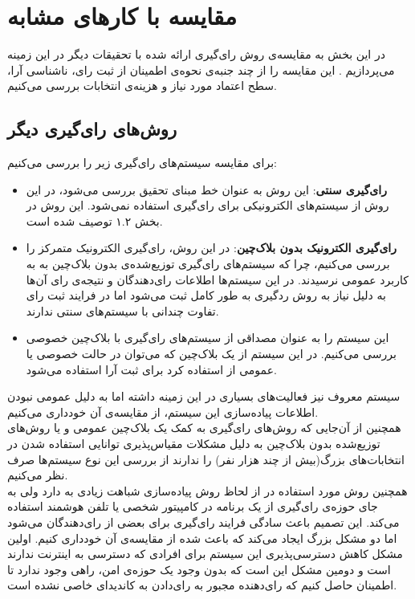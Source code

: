 \section{مقایسه با کارهای مشابه}
در این بخش به مقایسه‌‌ی روش رای‌گیری ارائه شده با تحقیقات دیگر در این زمینه می‌پردازیم . این مقایسه را از چند جنبه‌ی نحوه‌ی اطمینان از ثبت رای، ناشناسی آرا،  سطح اعتماد مورد نیاز و  هزینه‌ی انتخابات بررسی می‌کنیم. 
\subsection{روش‌های رای‌گیری دیگر}
برای مقایسه سیستم‌های رای‌گیری زیر را بررسی می‌کنیم:
\begin{itemize}
	\item 
	\textbf{رای‌گیری سنتی}:
	این روش به عنوان خط مبنای تحقیق بررسی می‌شود، در این روش از سیستم‌های الکترونیکی برای رای‌گیری استفاده نمی‌شود. این روش در بخش ۱.۲ توصیف شده است. 
	\item \textbf{رای‌‌گیری الکترونیک بدون بلاک‌چین}:
	در این روش، رای‌گیری الکترونیک متمرکز را بررسی می‌کنیم، چرا که سیستم‌های رای‌گیری توزیع‌شده‌ی بدون بلاک‌چین به به کاربرد عمومی نرسیدند. در این سیستم‌ها اطلاعات رای‌دهندگان و نتیجه‌ی رای آن‌ها به دلیل نیاز به روش ردگیری به طور کامل ثبت می‌شود اما در فرایند ثبت رای تفاوت چندانی با سیستم‌های سنتی ندارند.
 	\item \textbf{}
 	این سیستم را به عنوان مصداقی از سیستم‌های رای‌گیری با بلاک‌چین خصوصی بررسی می‌کنیم. 
 	در این سیستم از یک‌ بلاک‌چین که می‌توان در حالت خصوصی یا عمومی از استفاده کرد برای ثبت آرا استفاده می‌شود. 
\end{itemize}
\par
 	 سیستم‌ معروف  نیز فعالیت‌های بسیاری در این زمینه داشته اما به دلیل عمومی نبودن اطلاعات پیاده‌سازی این سیستم‌، از مقایسه‌ی آن خود‌داری می‌کنیم. 
 	 \\
 	 همچنین از آن‌جایی که روش‌های رای‌گیری به کمک یک بلاک‌چین عمومی و یا روش‌های توزیع‌شده بدون بلاک‌چین به دلیل مشکلات مقیاس‌پذیری توانایی استفاده شدن در انتخابات‌های بزرگ(بیش از چند هزار نفر) را ندارند از بررسی این نوع سیستم‌ها صرف نظر می‌کنیم.
 	 \\
 	 همچنین روش مورد استفاده در  از لحاظ روش پیاده‌سازی شباهت زیادی به  دارد ولی به جای حوزه‌ی رای‌گیری از یک برنامه در کامپیتور شخصی یا تلفن هوشمند استفاده می‌کند. این تصمیم باعث سادگی فرایند رای‌گیری برای بعضی از رای‌دهندگان می‌شود اما دو مشکل بزرگ ایجاد می‌کند که باعث شده از مقایسه‌ی آن خودداری کنیم. اولین مشکل کاهش دسترسی‌پذیری این سیستم برای افرادی که دسترسی به اینترنت ندارند است و دومین مشکل این است که بدون وجود یک حوزه‌ی امن، راهی وجود ندارد تا اطمینان حاصل کنیم که رای‌دهنده مجبور به رای‌دادن به کاندیدای خاصی نشده است.
